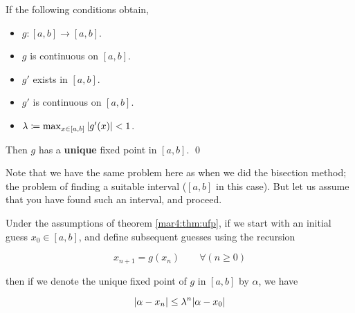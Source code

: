 \begin{thm}
	\label{mar4:thm:ufp}
	\hfill

	If the following conditions obtain,
	\begin{itemize}
		\item
		      $g \colon [a, b] \to [a, b]$.

		\item
		      $g$ is continuous on $[a, b]$.

		\item
		      $g'$ exists in $[a, b]$.

		\item
		      $g'$ is continuous on $[a, b]$.

		\item
		      $\lambda \coloneqq \max_{x \in [a, b]} \abs{g'(x)} < 1$.

	\end{itemize}
	Then $g$ has a \textbf{unique} fixed point in $[a, b]$.
	\hfill\qed
\end{thm}
Note that we have the same problem here as when we did the bisection method; the problem of finding a suitable interval ($[a, b]$ in this case). But let us assume that you have found such an interval, and proceed.

Under the assumptions of theorem \ref{mar4:thm:ufp}, if we start with an initial guess $x_0 \in [a, b]$, and define subsequent guesses using the recursion
\begin{defn}
	\label{mar4:def:iter}
	\[
		x_{n+1} = g(x_n) \qquad \forall(n \geq 0)
	\]
\end{defn}
then if we denote the unique fixed point of $g$ in $[a, b]$ by $\alpha$, we have
\begin{thm}
	\label{mar4:thm:2c}
	\[
		\abs{\alpha - x_n} \leq \lambda^n\abs{\alpha - x_0}
	\]
\end{thm}

